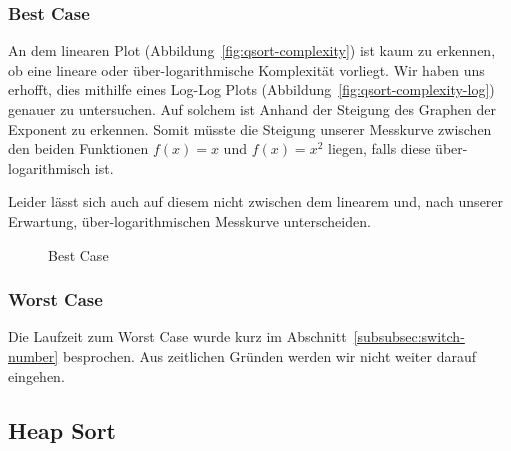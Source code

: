 \subsubsection{Best Case}\label{subsubsec:qsort-best-case}

An dem linearen Plot (Abbildung~\ref{fig:qsort-complexity})
ist kaum zu erkennen, ob eine lineare oder
über-logarithmische Komplexität vorliegt.
Wir haben uns erhofft, dies mithilfe eines Log-Log Plots
(Abbildung~\ref{fig:qsort-complexity-log}) genauer zu untersuchen.
Auf solchem ist Anhand der Steigung des Graphen der Exponent zu erkennen.
Somit müsste die Steigung unserer Messkurve zwischen den beiden Funktionen
\(f(x)=x\) und \(f(x)=x^2\) liegen, falls diese über-logarithmisch ist.

Leider lässt sich auch auf diesem nicht zwischen dem linearem und, nach
unserer Erwartung, über-logarithmischen Messkurve unterscheiden.

\begin{figure}[hbt]
    \centering
    \caption{Best Case}
\end{figure}


\subsubsection{Worst Case}\label{subsubsec:worst-case}
Die Laufzeit zum Worst Case wurde kurz im
Abschnitt~\ref{subsubsec:switch-number} besprochen.
Aus zeitlichen Gründen werden wir nicht weiter darauf eingehen.


\FloatBarrier
\subsection{Heap Sort}\label{subsec:heap-sort-laufzeit}
